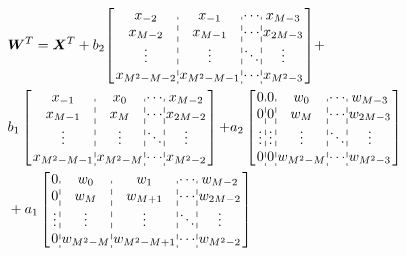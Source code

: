 \begin{equation}
    \label{eq:ZIC}
    \begin{aligned}
        &\bm{W}^T = \bm{X}^T 
        + b_2{\left[\arraycolsep=1.0pt\def\arraystretch{1.0}
        \begin{array}{c:c:c:c}
        x_{-2} & x_{-1} & \cdots & x_{M-3} \\ 
        x_{M-2} & x_{M-1} & \cdots & x_{2M-3} \\
        \vdots & \vdots & \ddots & \vdots \\
        x_{M^2-M-2} & x_{M^2-M-1} & \cdots & x_{M^2-3} \\
        \end{array}\right]} + \\ 
        & b_1\left[\arraycolsep=1.0pt\def\arraystretch{1.0}
        \begin{array}{c:c:c:c}
        x_{-1} & x_0 & \cdots & x_{M-2} \\ 
        x_{M-1} & x_M & \cdots & x_{2M-2} \\
        \vdots & \vdots & \ddots & \vdots \\
        x_{M^2-M-1} & x_{M^2-M} & \cdots & x_{M^2-2} \\
        \end{array}\right]
        {+} a_2\left[\arraycolsep=1.0pt\def\arraystretch{1.0}
                \begin{array}{c:c:c:c:c}
                0 & 0 & w_0 & \cdots & w_{M-3} \\ 
                0 & 0 & w_M & \cdots & w_{2M-3} \\
                \vdots & \vdots & \vdots & \ddots & \vdots \\
                0 & 0 & w_{M^2-M} & \cdots & w_{M^2-3} \\
                \end{array}\right] \\
        &+ a_1\left[\arraycolsep=1.0pt\def\arraystretch{1.0}
            \begin{array}{c:c:c:c:c}
            0 & w_0 & w_1 & \cdots & w_{M-2} \\ 
            0 & w_M & w_{M+1} & \cdots & w_{2M-2} \\
            \vdots & \vdots & \vdots & \ddots & \vdots \\
            0 & w_{M^2-M} & w_{M^2-M+1} & \cdots & w_{M^2-2} \\
            \end{array}\right]
    \end{aligned}
\end{equation}

